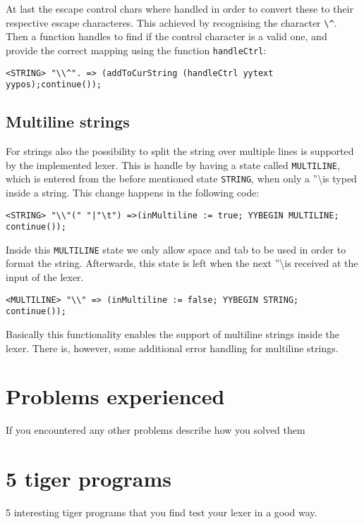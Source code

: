 \documentclass{article}
\begin{document}
At last the escape control chars where handled in order to convert these to their respective escape characteres. This achieved by recognising the character \texttt{\textbackslash \^}. Then a function handles to find if the control character is a valid one, and provide the correct mapping using the function \texttt{handleCtrl}:

\begin{lstlisting}[frame=single]
<STRING> "\\^". => (addToCurString (handleCtrl yytext yypos);continue());
\end{lstlisting}

\subsection{Multiline strings}
For strings also the possibility to split the string over multiple lines is supported by the implemented lexer. This is handle by having a state called \texttt{MULTILINE}, which is entered from the before mentioned state \texttt{STRING}, when only a ''\textbackslash is typed inside a string. This change happens in the following code:

\begin{lstlisting}[frame=single]
<STRING> "\\"(" "|"\t") =>(inMultiline := true; YYBEGIN MULTILINE; continue());
\end{lstlisting}

Inside this \texttt{MULTILINE} state we only allow space and tab to be used in order to format the string.
Afterwards, this state is left when the next ''\textbackslash is received at the input of the lexer. 
\begin{lstlisting}[frame=single]
<MULTILINE> "\\" => (inMultiline := false; YYBEGIN STRING; continue());
\end{lstlisting}

Basically this functionality enables the support of multiline strings inside the lexer. There is, however, some additional error handling for multiline strings.

\section{Problems experienced}
If you encountered any other problems describe how you solved them

\section{5 tiger programs}
5 interesting tiger programs that you find test your lexer in a good way.
\end{document}
